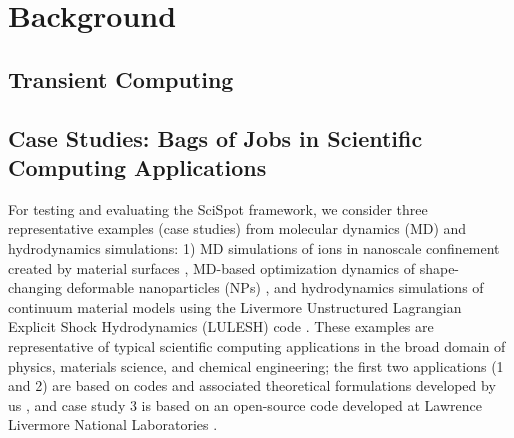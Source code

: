 
\section{Background}

\subsection{Transient Computing}



%
\subsection{Case Studies: Bags of Jobs in Scientific Computing Applications}

\begin{comment}
Describe the kind of computation. DONE

Scaling properties. Almost perfectly scalable with O(n) communication? UNCLEAR WHAT IS MEANT TO BE DONE HERE

This can be a like a case study of parallel scientific simulations.
Will help relate to parameters etc with more concrete examples. DONE

Bag of jobs.
Why multiple runs: parameter sweeps, search, or just multiple times to get confidence intervals and stable results in case of randomness. 
DONE I THINK
\end{comment}

For testing and evaluating the SciSpot framework, we consider three representative examples (case studies) from molecular dynamics (MD) and hydrodynamics simulations: 1) MD simulations of ions in nanoscale confinement created by material surfaces \cite{jjzo1,kadupitiya2017}, MD-based optimization dynamics of shape-changing deformable nanoparticles (NPs) \cite{jto1,jyto}, and hydrodynamics simulations of continuum material models using the Livermore Unstructured Lagrangian Explicit Shock Hydrodynamics (LULESH) code \cite{IPDPS13:LULESH,LULESH2:changes}. These examples are representative of typical scientific computing applications in the broad domain of physics, materials science, and chemical engineering; the first two applications (1 and 2) are based on codes and associated theoretical formulations developed by us \cite{jso1,jso2,solis2013generating,jjzo1,jto1,jyto}, and case study 3 is based on an open-source code developed at Lawrence Livermore National Laboratories \cite{IPDPS13:LULESH,LULESH:spec}. 

